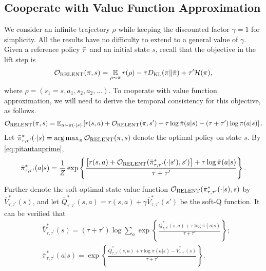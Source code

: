 \subsection{Cooperate with Value Function Approximation}
\label{subsec:repmd_value}
\newcommand{\parV}{V_{\phi}}
\newcommand{\parTargetV}{V_{\bar{\phi}}}
\newcommand{\parQ}{Q_{\psi}}
\newcommand{\parPi}{\pi_{\theta}}
\newcommand{\parQone}{Q_{\psi_1}}
\newcommand{\parQtwo}{Q_{\psi_2}}

We consider an infinite trajectory $\rho$ while keeping the discounted factor $\gamma=1$ for simplicity. All the results have no difficulty to extend to a  general value of $\gamma$. Given a reference policy $\bar{\pi}$ and an initial state $s$, recall that the objective in the lift step is 
\[
{\mathcal{O}}_{\text{RELENT}}(\pi, s) =   \operatorname*{\mathbb{E}}\limits_{\rho \sim \pi}{  r(\rho)  - \tau D_{\mathrm{KL}}(\pi \| \bar{\pi}) + \tau^{\prime} \mathcal{H}(\pi)}, 
\]
where $\rho=  (s_1 = s, a_1, s_2, a_2, \ldots)$.
 To cooperate with value function approximation, we will need to derive the temporal consistency for this objective, as follows. 
 \[
 {\mathcal{O}}_{\text{RELENT}}(\pi, s) = \mathbb{E}_{a\sim \pi(\cdot \vert s)} \left[ r(s,a) + {\mathcal{O}}_{\text{RELENT}}(\pi, s')  + \tau \log \bar{\pi}(a|s) - \left(\tau+ \tau' \right) \log \pi(a|s) \right]. 
 \]
Let $\bar{\pi}_{\tau,\tau^{\prime}}^* (\cdot|s) = \operatorname*{arg\,max}_{\pi} {\mathcal{O}}_{\text{RELENT}}(\pi, s) $ denote the optimal policy on state $s$. By \cref{eq:pitautauprime}, 
\[
\bar{\pi}_{\tau,\tau^{\prime}}^* (a|s) = \frac{1}{Z} \exp \left\{ \frac{\left[ r(s,a) + {\mathcal{O}}_{\text{RELENT}}(\bar{\pi}_{\tau,\tau^{\prime}}^* (\cdot|s'), s') \right] + \tau \log \bar{\pi}(a|s) }{\tau + \tau'} \right\}.
\]
Further denote the soft optimal state value function ${\mathcal{O}}_{\text{RELENT}}(\bar{\pi}_{\tau,\tau^{\prime}}^* (\cdot|s), s)$ by $\bar{V}_{\tau,\tau^{\prime}}^*(s)$, and let  $\bar{Q}_{\tau,\tau^{\prime}}^*(s,a) = r(s,a) + \gamma \bar{V}_{\tau,\tau^{\prime}}^*(s')$ be the soft-Q function.
 It can be verified that 
\begin{equation}
\begin{split}
& \bar{V}_{\tau,\tau^{\prime}}^*(s) = (\tau + \tau') \log \sum_a \exp \left\{ \frac{\bar{Q}_{\tau,\tau^{\prime}}^*(s,a) + \tau \log \bar{\pi}(a|s)} {\tau + \tau'} \right\}; \\
& \bar{\pi}_{\tau,\tau^{\prime}}^* (a|s) = \exp \left\{ \frac{\bar{Q}_{\tau,\tau^{\prime}}^*(s,a) + \tau \log \bar{\pi}(a|s) - \bar{V}_{\tau,\tau^{\prime}}^*(s)}{\tau + \tau'} \right\}.
\end{split}
\label{soft-v-and-pi}
\end{equation}
 
